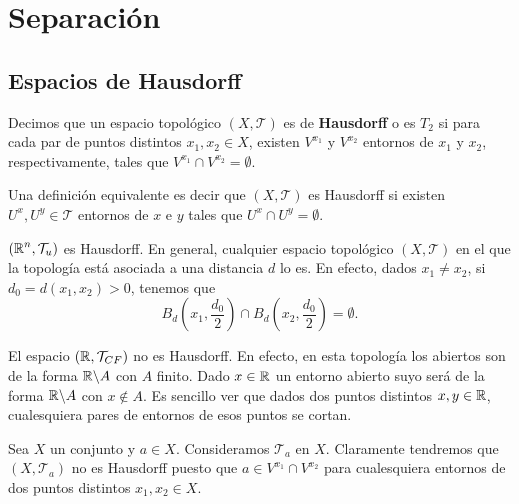 \chapter{Separación}

\section{Espacios de Hausdorff}
\begin{definition}
	Decimos que un espacio topológico $\displaystyle \left(X, \mathcal{T}\right) $ es de \textbf{Hausdorff} o es $\displaystyle T_{2} $ si para cada par de puntos distintos $\displaystyle x_{1}, x_{2} \in X $, existen $\displaystyle V^{x_{1}} $ y $\displaystyle V^{x_{2}} $ entornos de $\displaystyle x_{1} $ y $\displaystyle x_{2} $, respectivamente, tales que $\displaystyle V^{x_{1}}\cap V^{x_{2}} = \emptyset  $.
\end{definition}
\begin{observation}
Una definición equivalente es decir que $\displaystyle \left(X, \mathcal{T}\right) $ es Hausdorff si existen $\displaystyle U^{x}, U^{y} \in \mathcal{T} $ entornos de $\displaystyle x $ e $\displaystyle y $ tales que $\displaystyle U^{x}\cap U^{y} = \emptyset $. 
\end{observation}
\begin{eg}
$\displaystyle \left(\mathbb{R}^{n}, \mathcal{T}_{u}\right) $ es Hausdorff. En general, cualquier espacio topológico $\displaystyle \left(X, \mathcal{T}\right) $ en el que la topología está asociada a una distancia $\displaystyle d $ lo es. En efecto, dados $\displaystyle x_{1} \neq x_{2} $, si $\displaystyle d _{0}= d\left(x_{1}, x_{2}\right)>0 $, tenemos que 
\[B_{d}\left(x_{1}, \frac{d _{0}}{2}\right)\cap B_{d}\left(x_{2}, \frac{d _{0}}{2}\right)= \emptyset .\]
\end{eg}

\begin{eg}
El espacio $\displaystyle \left(\mathbb{R}, \mathcal{T}_{CF}\right) $ no es Hausdorff. En efecto, en esta topología los abiertos son de la forma $\displaystyle \mathbb{R} \backslash A $ con $\displaystyle A $ finito. Dado $\displaystyle x \in \mathbb{R} $ un entorno abierto suyo será de la forma $\displaystyle \mathbb{R} \backslash A $ con $\displaystyle x \not\in A $. Es sencillo ver que dados dos puntos distintos $\displaystyle x,y \in \mathbb{R} $, cualesquiera pares de entornos de esos puntos se cortan. 
\end{eg}

\begin{eg}
Sea $\displaystyle X $ un conjunto y $\displaystyle a \in X $. Consideramos $\displaystyle \mathcal{T}_{a} $ en $\displaystyle X $. Claramente tendremos que $\displaystyle \left(X, \mathcal{T}_{a}\right) $ no es Hausdorff puesto que $\displaystyle a \in V^{x_{1}} \cap V^{x_{2}} $ para cualesquiera entornos de dos puntos distintos $\displaystyle x_{1}, x_{2} \in X $. 
\end{eg}

